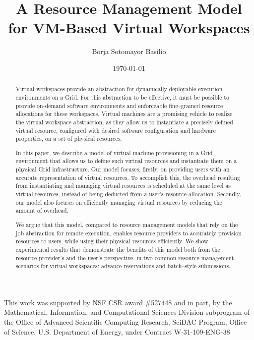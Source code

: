 \documentclass[singlespace]{ccw_chithesis}
\begin{document}
\title{A Resource Management Model for VM-Based Virtual Workspaces}
\author{Borja Sotomayor Basilio}
\date{\today}
\maketitle

\begin{abstract}
Virtual workspaces provide an abstraction for dynamically deployable execution environments on a Grid. For this abstraction to be effective, it must be possible to provide on-demand software environments and enforceable fine--grained resource allocations for these workspaces. Virtual machines are a promising vehicle to realize the virtual workspace abstraction, as they allow us to instantiate a precisely defined virtual resource, configured with desired software configuration and hardware properties, on a set of physical resources.

In this paper, we describe a model of virtual machine provisioning in a Grid environment that allows us to define such virtual resources and instantiate them on a physical Grid infrastructure. Our model focuses, firstly, on providing users with an accurate representation of virtual resources. To accomplish this, the overhead resulting from instantiating and managing virtual resources is scheduled at the same level as virtual resources, instead of being deducted from a user's resource allocation. Secondly, our model also focuses on efficiently managing virtual resources by reducing the amount of overhead.

We argue that this model, compared to resource management models that rely on the job abstraction for remote execution, enables resource providers to accurately provision resources to users, while using their physical resources efficiently. We show experimental results that demonstrate the benefits of this model both from the resource provider's and the user's perspective, in two common resource management scenarios for virtual workspaces: advance reservations and batch--style submissions.
\end{abstract}

\acknowledgments
This work was supported by NSF CSR award \#527448 and in part, by the
Mathematical, Information, and Computational Sciences Division
subprogram of the Office of Advanced Scientific Computing Research,
SciDAC Program, Office of Science, U.S. Department of Energy, under
Contract W{}-31{}-109{}-ENG{}-38
\end{document}
